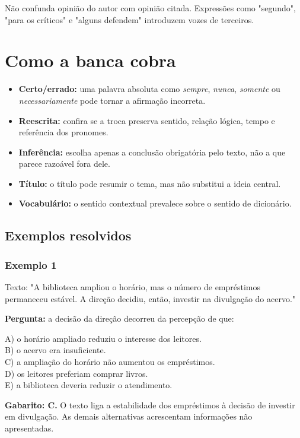 \documentclass[11pt,a4paper]{article}
\begin{document}
Não confunda opinião do autor com opinião citada. Expressões como "segundo", "para os críticos" e "alguns defendem" introduzem vozes de terceiros.

\section*{Como a banca cobra}

\begin{itemize}
  \item \textbf{Certo/errado:} uma palavra absoluta como \textit{sempre}, \textit{nunca}, \textit{somente} ou \textit{necessariamente} pode tornar a afirmação incorreta.
  \item \textbf{Reescrita:} confira se a troca preserva sentido, relação lógica, tempo e referência dos pronomes.
  \item \textbf{Inferência:} escolha apenas a conclusão obrigatória pelo texto, não a que parece razoável fora dele.
  \item \textbf{Título:} o título pode resumir o tema, mas não substitui a ideia central.
  \item \textbf{Vocabulário:} o sentido contextual prevalece sobre o sentido de dicionário.
\end{itemize}

\subsection*{Exemplos resolvidos}

\subsubsection*{Exemplo 1}

Texto: "A biblioteca ampliou o horário, mas o número de empréstimos permaneceu estável. A direção decidiu, então, investir na divulgação do acervo."

\textbf{Pergunta:} a decisão da direção decorreu da percepção de que:

A) o horário ampliado reduziu o interesse dos leitores. \\ B) o acervo era insuficiente. \\ C) a ampliação do horário não aumentou os empréstimos. \\ D) os leitores preferiam comprar livros. \\ E) a biblioteca deveria reduzir o atendimento.

\begin{alerta}
\textbf{Gabarito: C.} O texto liga a estabilidade dos empréstimos à decisão de investir em divulgação. As demais alternativas acrescentam informações não apresentadas.
\end{alerta}
\end{document}
